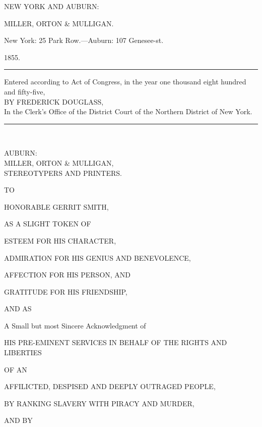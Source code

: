 {NEW YORK AND AUBURN:}

{{MILLER, ORTON \& MULLIGAN.}}

{New York: 25 Park Row.---Auburn: 107 Genesee-st.}

1855.

{\protect\hypertarget{ux5cux7bux5cux7bux5cux7b1ux5cux7dux5cux7dux5cux7d}{}{}}

{\protect\hypertarget{ii}{}{}}

\begin{center}\rule{0.5\linewidth}{\linethickness}\end{center}

{Entered according to Act of Congress, in the year one thousand eight
hundred and fifty-five,}\\
{BY FREDERICK DOUGLASS,}\\
{In the Clerk's Office of the District Court of the Northern District of
New York.}

\begin{center}\rule{0.5\linewidth}{\linethickness}\end{center}

~

{AUBURN:}\\
{{MILLER, ORTON \& MULLIGAN,}}\\
{STEREOTYPERS AND PRINTERS.}

{\protect\hypertarget{ux5cux7bux5cux7bux5cux7b1ux5cux7dux5cux7dux5cux7d}{}{}}

{\protect\hypertarget{iii}{}{}}

TO

{{HONORABLE GERRIT SMITH,}}

{AS A SLIGHT TOKEN OF}

{ESTEEM FOR HIS CHARACTER},

{ADMIRATION FOR HIS GENIUS AND BENEVOLENCE,}

AFFECTION FOR HIS PERSON, AND

{{GRATITUDE FOR HIS FRIENDSHIP},}

{AND AS}

{\textgerman{A Small but most Sincere Acknowledgment of}}

{HIS PRE-EMINENT SERVICES IN BEHALF OF THE RIGHTS AND LIBERTIES}

{OF AN}

AFFILICTED, DESPISED AND DEEPLY OUTRAGED PEOPLE,

{BY RANKING SLAVERY WITH PIRACY AND MURDER,}

{AND BY}

